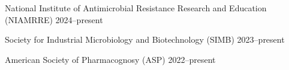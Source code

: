 

\begin{cvhonors}

\cvhonor
{National Institute of Antimicrobial Resistance Research and Education (NIAMRRE)}
{}
{2024--present}

\cvhonor
{Society for Industrial Microbiology and Biotechnology (SIMB)}
{}
{2023--present}

\cvhonor
{American Society of Pharmacognosy (ASP)}
{}
{2022--present}





\end{cvhonors}